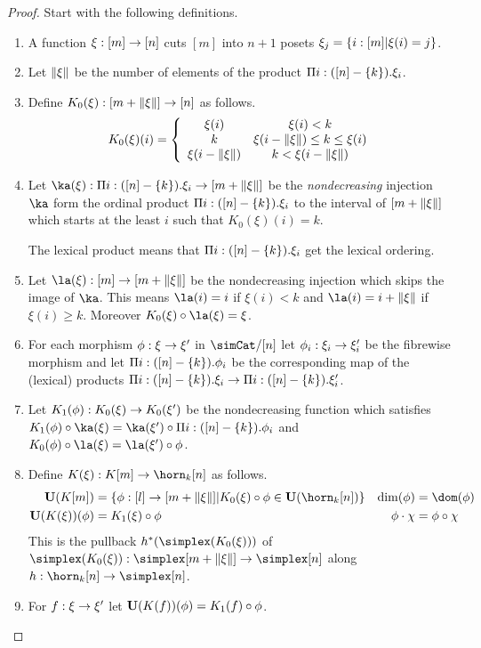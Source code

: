 \documentclass[csh.tex]{subfiles}
\begin{document}
\begin{proof} Start with the following definitions.
\begin{enumerate}
\item A function $\xi:[m]\to[n]$ cuts $[m]$ into $n+1$ posets $\xi_j = \left\{i:[m]|\xi(i)=j\right\}$. 
\item Let $\Vert \xi \Vert$ be the number of elements of the product $\Pi i: ([n]-\left\{k\right\}).\xi_i$. 
\item Define $K_0(\xi): [m+\Vert \xi \Vert]\to [n]$ as follows.
\[ 
	K_0(\xi)(i) = \left\{
		\begin{array}{cc}
			\xi(i) & \xi(i)<k \\
			k & \xi(i-\Vert \xi \Vert)\leq k \leq \xi(i)\\
			\xi(i-\Vert \xi \Vert) & k<\xi(i-\Vert \xi \Vert)
		\end{array}
	\right.
\]
\item Let $\ka(\xi)\of\Pi i\of([n]-\set k).\xi_i \to [m+\norm\xi]$ be the \emph{nondecreasing} injection $\ka$ form the ordinal product $\Pi i:([n]-\left\{k\right\}).\xi_i$ to the interval of $[m+\Vert \xi \Vert]$ which starts at the least $i$ such that $K_0(\xi)(i)=k$.

The lexical product means that $\Pi i:([n]-\left\{k\right\}).\xi_i$ get the lexical ordering. %

\item Let $\la(\xi)\of[m]\to[m+\norm\xi]$ be the nondecreasing injection which skips the image of $\ka$. This means $\la(i)=i$ if $\xi(i)<k$ and $\la(i)=i+\norm\xi$ if $\xi(i)\geq k$. Moreover $K_0(\xi)\circ\la(\xi) = \xi$.
\item For each morphism $\phi:\xi\to\xi'$ in $\simCat/[n]$ let $\phi_i:\xi_i\to\xi'_i$ be the fibrewise morphism and let $\Pi i:([n]-\left\{k\right\}).\phi_i$ be the corresponding map of the (lexical) products $\Pi i:([n]-\left\{k\right\}).\xi_i\to\Pi i:([n]-\left\{k\right\}).\xi'_i$.
\item Let $K_1(\phi): K_0(\xi)\to K_0(\xi')$ be the nondecreasing function which satisfies $K_1(\phi)\circ \ka(\xi) = \ka(\xi')\circ \Pi i\of([n]-\set k).\phi_i$ and $K_0(\phi)\circ \la(\xi) = \la(\xi')\circ \phi$.
\item Define $K(\xi)\of K[m]\to\horn_k[n]$ as follows.
\begin{align*}
\base(K[m]) &= \set{\phi\of [l]\to [m+\norm\xi]|K_0(\xi)\circ\phi\in\base(\horn_k[n]) } & \dim(\phi) &= \dom(\phi) \\
\base(K(\xi))(\phi) &= K_1(\xi)\circ\phi & \phi\cdot\chi &= \phi\circ\chi
\end{align*}
This is the pullback $h\ri(\simplex(K_0(\xi)))$ of $\simplex(K_0(\xi))\of\simplex[m+\norm\xi]\to\simplex[n]$ along $h\of\horn_k[n]\to\simplex[n]$.
\item For $f: \xi\to\xi'$ let $\mathbf{U}(K(f))(\phi) = K_1(f)\circ \phi$.
\end{enumerate}


\end{proof}
\end{document}
